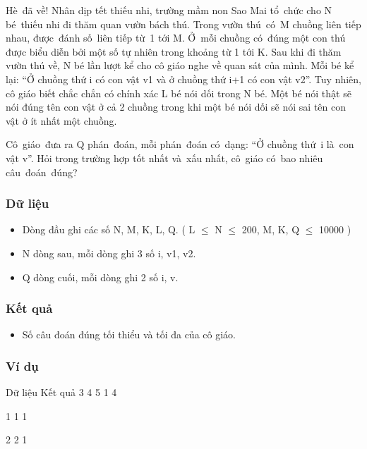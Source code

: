 



      Hè đã về! Nhân dịp  tết thiếu nhi, trường mầm non Sao Mai tổ chức cho  N bé thiếu nhi đi thăm quan vườn bách thú. Trong vườn  thú có M chuồng liên tiếp nhau, được đánh  số liên tiếp từ 1 tới M. Ở mỗi chuồng  có đúng một con thú được biểu diễn bởi một số  tự nhiên trong khoảng từ 1 tới K. Sau khi đi thăm vườn  thú về, N bé lần lượt kể cho cô giáo nghe về quan sát  của mình. Mỗi bé kể lại: “Ở chuồng thứ i có con vật  v1 và ở chuồng thứ i+1 có con vật v2”. Tuy nhiên, cô giáo  biết chắc chắn có chính xác L bé nói dối trong N bé. Một  bé nói thật sẽ nói đúng tên con vật ở cả 2 chuồng  trong khi một bé nói dối sẽ nói sai tên con vật ở ít  nhất một chuồng.     

      Cô giáo đưa ra  Q phán đoán, mỗi phán đoán có dạng: “Ở  chuồng thứ i là con vật v”. Hỏi trong trường  hợp tốt nhất và xấu nhất, cô giáo có bao  nhiêu câu đoán đúng?     

\subsubsection{     Dữ liệu    }
\begin{itemize}
	\item        Dòng đầu ghi    các số N, M, K, L, Q. ( L  $\le$  N  $\le$  200, M, K, Q  $\le$  10000    )      
	\item        N dòng sau, mỗi    dòng ghi 3 số i, v1, v2.      
	\item        Q dòng cuối,    mỗi dòng ghi 2 số i, v.      
\end{itemize}

\subsubsection{     Kết quả    }
\begin{itemize}
	\item        Số câu đoán    đúng tối thiểu và tối đa của cô giáo.      
\end{itemize}

\subsubsection{     Ví dụ    }          Dữ liệu                   Kết quả                   3 4 5 1 4         

           1 1 1          

           2 2 1          


